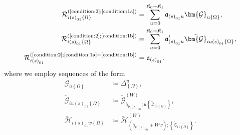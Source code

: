 \begin{align}
\mathcal{R}
_{i\left(s\right)_{01}\left\{\Omega\right\}}
^{\left(\text{\ref{condition:2}};\text{\ref{condition:1a}}\right)}
    &=
        \sum_{u=0}^{\mathfrak{K}_{0}+\mathfrak{K}_{1}}
        \mathfrak{a}_{\left(s\right)_{01}u}
        \bm{\mathcal{G}}_{u\left\{\Omega\right\}}
,\\
\mathcal{R}
_{i\left(s\right)_{01}\left\{\Omega\right\}}
^{\left(\text{\ref{condition:2}};\text{\ref{condition:1b}}\right)}
    &=
        \sum_{u=0}^{\mathfrak{K}_{0}+\mathfrak{K}_{1}}
        \mathfrak{a}_{\left(s\right)_{01}u}^{\prime}
        \tilde{\bm{\mathcal{G}}}_{iu\left(s\right)_{01}\left\{\Omega\right\}}
,\\
\mathcal{R}
_{i\left(s\right)_{01}}
^{
    \left(\text{\ref{condition:2}};
    \text{\ref{condition:1a}}+\text{\ref{condition:1b}}\right)
}
    &= \mathfrak{a}_{\left(s\right)_{01}}
.
\end{align}
where we employ sequences of the form
\begin{align}
\bm{\mathcal{G}}_{u\left\{\Omega\right\}}
    &\coloneqq
        \Delta_{\left\{\Omega\right\}}^{u}
,\\
\tilde{\bm{\mathcal{G}}}_{iu\left(s\right)_{01}\left\{\Omega\right\}}
    &\coloneqq
        \tilde{\mathcal{G}}
        _{
            \mathfrak{h}_{\mathfrak{d}_{i}\left(s\right)_{01}};u
            \left\{\tilde{\mathcal{Z}}_{i0\left\{\Omega\right\}}\right\}
        }
        ^{\left(W\right)}
,\\
\tilde{\bm{\mathcal{H}}}_{i\left(s\right)_{01}w\left\{\Omega\right\}}
    &\coloneqq
        \tilde{\mathcal{H}}
        _{
            \left(\mathfrak{h}_{\mathfrak{d}_{i}\left(s\right)_{01}}+Ww\right);
            \left\{\tilde{\mathcal{Z}}_{i1\left\{\Omega\right\}}\right\}
        }
        ^{\left(W\right)}
.
\end{align}